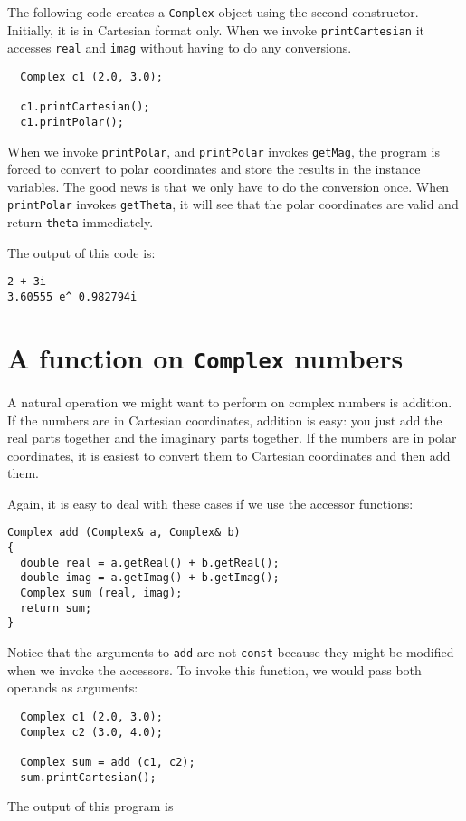 The following code creates a {\tt Complex} object using the
second constructor.   Initially, it is in Cartesian format only.
When we invoke {\tt printCartesian} it accesses {\tt real} and
{\tt imag} without having to do any conversions.

\begin{verbatim}
  Complex c1 (2.0, 3.0);

  c1.printCartesian();
  c1.printPolar();
\end{verbatim}
%
When we invoke {\tt printPolar}, and {\tt printPolar} invokes
{\tt getMag}, the program is forced to convert to polar
coordinates and store the results in the instance variables.
The good news is that we only have to do the conversion
once.  When {\tt printPolar} invokes {\tt getTheta}, it will
see that the polar coordinates are valid and return {\tt theta}
immediately.

The output of this code is:

\begin{verbatim}
2 + 3i
3.60555 e^ 0.982794i
\end{verbatim}

\section{A function on {\tt Complex} numbers}

A natural operation we might want to perform on complex numbers is
addition.  If the numbers are in Cartesian coordinates, addition is
easy: you just add the real parts together and the imaginary parts
together.  If the numbers are in polar coordinates, it is easiest to
convert them to Cartesian coordinates and then add them.

Again, it is easy to deal with these cases if we use
the accessor functions:

\begin{verbatim}
Complex add (Complex& a, Complex& b)
{
  double real = a.getReal() + b.getReal();
  double imag = a.getImag() + b.getImag();
  Complex sum (real, imag);
  return sum;
}
\end{verbatim}
%
Notice that the arguments to {\tt add} are not {\tt const}
because they might be modified when we invoke the accessors.
To invoke this function, we would pass both operands as arguments:

\begin{verbatim}
  Complex c1 (2.0, 3.0);
  Complex c2 (3.0, 4.0);

  Complex sum = add (c1, c2);
  sum.printCartesian();
\end{verbatim}
%
The output of this program is

